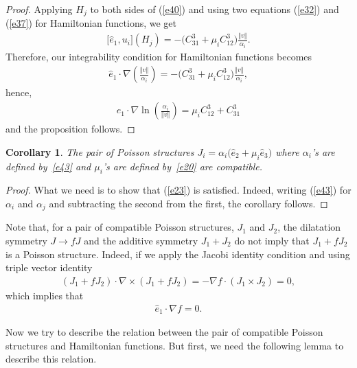 \documentclass[10pt,a4paper]{amsart}
\numberwithin{equation}{section}
\newtheorem{Corollary}[Theorem]{Corollary}
\begin{document}
\begin{proof}
Applying $H_{j}$ to both sides of (\ref{e40}) and using two equations (\ref{e32}) and (\ref{e37}) for Hamiltonian functions, we get
\begin{gather*}
\big[ \widehat{e}_{1},u_{i}\big] (H_{j}) =-\big(C_{31}^{3}+\mu _{i}C_{12}^{3}\big) \frac{\Vert v\Vert }{\alpha_{i}}. %
\end{gather*}
Therefore, our integrability condition for Hamiltonian functions becomes
\begin{gather*}
\widehat{e}_{1}\cdot \nabla \left( \frac{\Vert v\Vert }{\alpha_{i}}\right) =-\big( C_{31}^{3}+\mu _{i}C_{12}^{3}\big) \frac{\Vert v\Vert }{\alpha _{i}},
\end{gather*}
hence,
\begin{gather}
\widehat{e}_{1}\cdot \nabla \ln \left( \frac{\alpha _{i}}{\Vert v\Vert }\right) =\mu _{i}C_{12}^{3}+C_{31}^{3} \label{e43}
\end{gather}
and the proposition follows.
\end{proof}

\begin{Corollary}\label{corollary1}
The pair of Poisson structures $J_{i}=\alpha _{i}\big( \widehat{e}_{2}+\mu_{i}\widehat{e}_{3}\big) $ where $\alpha _{i}$'s are defined by~\eqref{e43} and $\mu _{i}$'s are defined by~\eqref{e20} are compatible.
\end{Corollary}

\begin{proof}
What we need is to show that (\ref{e23}) is satisf\/ied. Indeed, writing (\ref{e43}) for $\alpha _{i}$ and $\alpha_{j}$ and subtracting the second from the f\/irst, the corollary follows.
\end{proof}

Note that, for a pair of compatible Poisson structures, $J_{1}$ and $J_{2}$, the dilatation symmetry $J\rightarrow fJ$ and the additive symmetry $J_{1}+J_{2}$ do not imply that $J_{1}+fJ_{2}$ is a Poisson structure. Indeed, if we apply the Jacobi identity condition and using triple vector identity
\begin{gather*}
( J_{1}+fJ_{2}) \cdot \nabla \times (J_{1}+fJ_{2})=-\nabla f\cdot ( J_{1}\times J_{2}) =0,
\end{gather*}
which implies that
\begin{gather*}
\widehat{e}_{1}\cdot \nabla f=0.
\end{gather*}

Now we try to describe the relation between the pair of compatible Poisson structures and Hamiltonian functions. But f\/irst, we need the following lemma to describe this relation.
\end{document}
